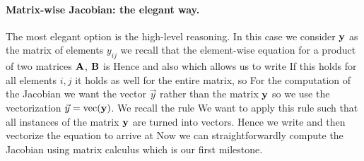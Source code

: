 \paragraph{Matrix-wise Jacobian: the elegant way.} The most elegant option is the high-level reasoning. In this case we consider $\bf y$ as the matrix of elements $y_{ij}$  we recall that the element-wise equation for a product of two matrices $\bf A$, $\bf B$ is 
 Hence 
 and also 
 which allows us to write 
 If this holds for all elements $i,j$ it holds as well for the entire matrix, so 
 For the computation of the Jacobian we want the vector $\vec{y}$ rather than the matrix $\bf y$ so we use the vectorization $\vec{y}={\rm vec} ({\bf y})$. We recall the rule 
 We want to apply this rule such that all instances of the matrix ${\bf y}$ are turned into vectors. Hence we write 
 and then vectorize the equation to arrive at  
Now we can straightforwardly compute the Jacobian using matrix calculus
which is our first milestone. 

